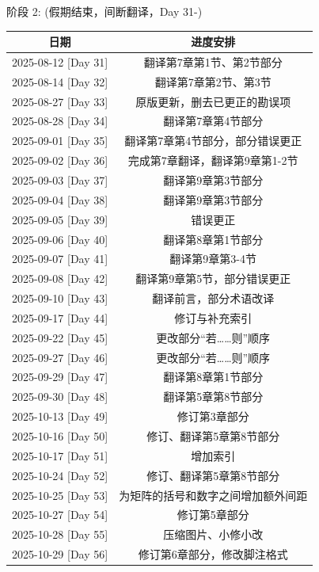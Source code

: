 \documentclass{ctexart}
\begin{document}
\pagebreak

阶段 2: (假期结束，间断翻译，Day 31-)

\begin{table}[h]
    \centering
    \begin{tabular}{|c|c|}
    \hline
    \textbf{日期} & \textbf{进度安排}  \\ \hline
    2025-08-12 [Day 31] & 翻译第7章第1节、第2节部分\\ \hline
    2025-08-14 [Day 32] & 翻译第7章第2节、第3节\\ \hline
    2025-08-27 [Day 33] & 原版更新，删去已更正的勘误项\\ \hline
    2025-08-28 [Day 34] & 翻译第7章第4节部分\\ \hline
    2025-09-01 [Day 35] & 翻译第7章第4节部分，部分错误更正\\ \hline
    2025-09-02 [Day 36] & 完成第7章翻译，翻译第9章第1-2节\\ \hline
    2025-09-03 [Day 37] & 翻译第9章第3节部分\\ \hline
    2025-09-04 [Day 38] & 翻译第9章第3节部分\\ \hline
    2025-09-05 [Day 39] & 错误更正\\ \hline
    2025-09-06 [Day 40] & 翻译第8章第1节部分\\ \hline
    2025-09-07 [Day 41] & 翻译第9章第3-4节\\ \hline
    2025-09-08 [Day 42] & 翻译第9章第5节，部分错误更正\\ \hline
    2025-09-10 [Day 43] & 翻译前言，部分术语改译\\ \hline
    2025-09-17 [Day 44] & 修订与补充索引\\ \hline
    2025-09-22 [Day 45] & 更改部分“若……则”顺序\\ \hline
    2025-09-27 [Day 46] & 更改部分“若……则”顺序\\ \hline
    2025-09-29 [Day 47] & 翻译第8章第1节部分\\ \hline
    2025-09-30 [Day 48] & 翻译第5章第8节部分\\ \hline
    2025-10-13 [Day 49] & 修订第3章部分\\ \hline
    2025-10-16 [Day 50] & 修订、翻译第5章第8节部分\\ \hline
    2025-10-17 [Day 51] & 增加索引\\ \hline
    2025-10-24 [Day 52] & 修订、翻译第5章第8节部分\\ \hline
    2025-10-25 [Day 53] & 为矩阵的括号和数字之间增加额外间距\\ \hline
    2025-10-27 [Day 54] & 修订第5章部分\\ \hline
    2025-10-28 [Day 55] & 压缩图片、小修小改\\ \hline
    2025-10-29 [Day 56] & 修订第6章部分，修改脚注格式\\ \hline
    \end{tabular}
\end{table}
\end{document}
